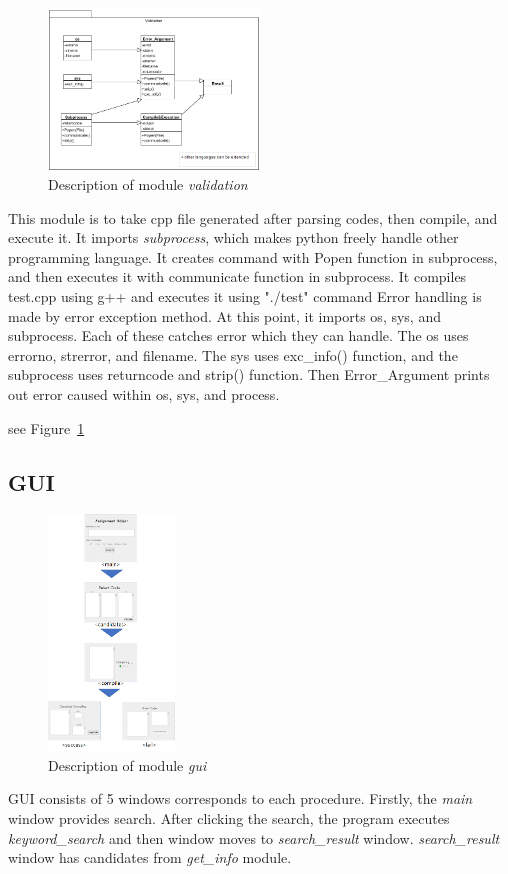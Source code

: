 \documentclass[conference]{IEEEtran}
\begin{document}
\label{sub:validation}
\begin{figure}[ht]
\centering
\includegraphics[width=0.5\textwidth]{./figures/comp_exec.png}
\caption{Description of module \textit{validation}}
\label{validation}
\end{figure}

This module is to take cpp file generated after parsing codes, then compile, and execute it.
It imports \textit{subprocess}, which makes python freely handle other programming language.
It creates command with Popen function in subprocess, and then executes it with communicate function in subprocess.
It compiles test.cpp using g++ and executes it using "./test" command
Error handling is made by error exception method. 
At this point, it imports os, sys, and subprocess. 
Each of these catches error which they can handle.
The os uses errorno, strerror, and filename.
The sys uses exc\_info() function, and the subprocess uses returncode and strip() function.
Then Error\_Argument prints out error caused within os, sys, and process.

see Figure~\ref{validation}


\subsection{GUI} %
\label{sub:gui}
\begin{figure}[ht]
\centering
\includegraphics[width=0.3\textwidth]{./figures/gui_overall.png}
\caption{Description of module \textit{gui}}
\label{gui}
\end{figure}
GUI consists of 5 windows corresponds to each procedure.
Firstly, the \textit{main} window provides search.
After clicking the search, the program executes \textit{keyword\_search} and then window moves to \textit{search\_result} window.
\textit{search\_result} window has candidates from \textit{get\_info} module.
\end{document}
